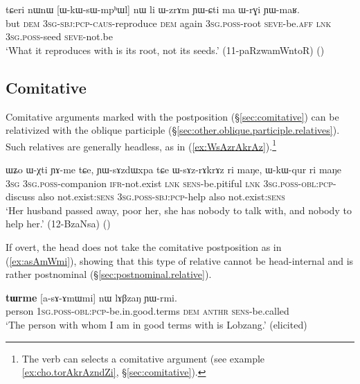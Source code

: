 \begin{exe}
\ex \label{ex:WkWsWmphWl}
\gll tɕeri nɯnɯ [ɯ-kɯ-sɯ-mpʰɯl] nɯ li ɯ-zrɤm ɲɯ-ɕti ma ɯ-rɣi ɲɯ-maʁ.  \\
but \textsc{dem} \textsc{3sg}-\textsc{sbj}:\textsc{pcp}-\textsc{caus}-reproduce \textsc{dem} again \textsc{3sg}.\textsc{poss}-root \textsc{seve}-be.\textsc{aff} \textsc{lnk} \textsc{3sg}.\textsc{poss}-seed \textsc{seve}-not.be \\
\glt `What it reproduces with is its root, not its seeds.' (11-paRzwamWntoR)
()
\end{exe}
 
\subsection{Comitative} \label{sec:comitative.relativization}
Comitative arguments marked with the postposition  (§\ref{sec:comitative}) can be relativized with the oblique participle (§\ref{sec:other.oblique.participle.relatives}). Such relatives are generally headless, as in (\ref{ex:WsAzrAkrAz}).\footnote{The verb  can selects a comitative argument (see example \ref{ex:cho.torAkrAzndZi}, §\ref{sec:comitative}). }

\begin{exe}
\ex \label{ex:WsAzrAkrAz}
\gll ɯʑo ɯ-χti ɲɤ-me tɕe, ɲɯ-sɤzdɯxpa tɕe ɯ-sɤz-rɤkrɤz ri maŋe, ɯ-kɯ-qur ri maŋe \\
 \textsc{3sg} \textsc{3sg}.\textsc{poss}-companion \textsc{ifr}-not.exist \textsc{lnk} \textsc{sens}-be.pitiful \textsc{lnk} \textsc{3sg}.\textsc{poss}-\textsc{obl}:\textsc{pcp}-discuss also not.exist:\textsc{sens} \textsc{3sg}.\textsc{poss}-\textsc{sbj}:\textsc{pcp}-help also not.exist:\textsc{sens} \\
\glt `Her husband passed away, poor her, she has nobody to talk with, and nobody to help her.' (12-BzaNsa)
()
\end{exe}

If overt, the head does not take the comitative postposition  as in (\ref{ex:asAmWmi}), showing that this type of relative cannot be head-internal and is rather postnominal (§\ref{sec:postnominal.relative}).

\begin{exe}
\ex \label{ex:asAmWmi}
\gll \textbf{tɯrme} [a-sɤ-ɤmɯmi] nɯ lɤβzaŋ ɲɯ-rmi. \\
person \textsc{1sg}.\textsc{poss}-\textsc{obl}:\textsc{pcp}-be.in.good.terms \textsc{dem}  \textsc{anthr} \textsc{sens}-be.called \\
\glt `The person with whom I am in good terms with is Lobzang.' (elicited)
\end{exe}



